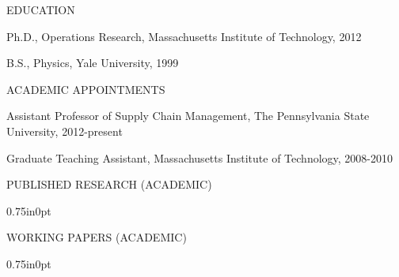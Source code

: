 \documentclass[letterpaper,11pt,oneside]{article}
\newcommand\myIndent{0.75in}
\newcommand\myHangIndent{1in}
\newcommand\mySpaceBeforeSection{0.9em}
\newcommand\myNegSpaceCorrectBib{-4.25em}
\newcommand\mySpaceBeforeSectionAfterBib{0em}
\newcommand{\NiceIndent}{ \parindent=\myIndent \hangindent=\myHangIndent }
\begin{document}
\vspace{\mySpaceBeforeSection}



\noindent EDUCATION

\NiceIndent Ph.D., Operations Research, Massachusetts Institute of Technology, 2012

\NiceIndent B.S., Physics, Yale University, 1999


\vspace{\mySpaceBeforeSection}


\noindent ACADEMIC APPOINTMENTS

\NiceIndent Assistant Professor of Supply Chain Management, The Pennsylvania State University, 2012-present 

\NiceIndent Graduate Teaching Assistant, Massachusetts Institute of Technology, 2008-2010



\vspace{\mySpaceBeforeSection}
\noindent PUBLISHED RESEARCH (ACADEMIC)
\vspace{\myNegSpaceCorrectBib}
\begin{bibunit}

    \begin{adjustwidth}{\myIndent}{0pt}
        \nocite{fearing_how_2011}
        \nocite{acimovic_making_2015}
        \nocite{acimovic_models_2016}
        \nocite{grober_fundamental_2000}
        \nocite{acimovic_mitigating_2016}
        \nocite{hu_forecasting_2016}
        \nocite{acimovic_dataset_2017}
        \putbib
    \end{adjustwidth}
\end{bibunit}

\vspace{\mySpaceBeforeSectionAfterBib}
\noindent WORKING PAPERS (ACADEMIC)
\vspace{\myNegSpaceCorrectBib}
\begin{bibunit}
    \begin{adjustwidth}{\myIndent}{0pt}
       \nocite{acimovic_show_2018}
       

        \putbib
    \end{adjustwidth}
\end{bibunit}
\end{document}
